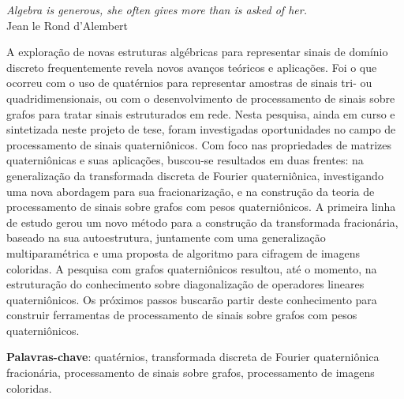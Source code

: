 \documentclass[
	11pt,				%
	openright,			%
	twoside,			%
	a4paper,			%
	french,				%
	brazil,			%
	english				%
	]{abntex2}
\begin{document}

\begin{epigrafe}
\vspace*{\fill}
\begin{flushright}
\textit{Algebra is generous, she often gives more than is asked of her.}\\
Jean le Rond d'Alembert
\end{flushright}
\end{epigrafe}


\setlength{\absparsep}{18pt} %
\begin{resumo}
A explora\c c\~ao de novas estruturas alg\'ebricas para representar sinais de dom\'inio discreto frequentemente revela novos avan\c cos te\'oricos e aplica\c c\~oes. Foi o que ocorreu com o uso de quat\'ernios para representar amostras de sinais tri- ou quadridimensionais, ou com o desenvolvimento de processamento de sinais sobre grafos para tratar sinais estruturados em rede. Nesta pesquisa, ainda em curso e sintetizada neste projeto de tese, foram investigadas oportunidades no campo de processamento de sinais quaterni\^onicos. Com foco nas propriedades de matrizes quaterni\^onicas e suas aplica\c c\~oes, buscou-se resultados em duas frentes: na generaliza\c c\~ao da transformada discreta de Fourier quaterni\^onica, investigando uma nova abordagem para sua fracionariza\c c\~ao, e na constru\c c\~ao da teoria de processamento de sinais sobre grafos com pesos quaterni\^onicos. A primeira linha de estudo gerou um novo m\'etodo para a constru\c c\~ao da transformada fracion\'aria, baseado na sua autoestrutura, juntamente com uma generaliza\c c\~ao multiparam\'etrica e uma proposta de algoritmo para cifragem de imagens coloridas. A pesquisa com grafos quaterni\^onicos resultou, at\'e o momento, na estrutura\c c\~ao do conhecimento sobre diagonaliza\c c\~ao de operadores lineares quaterni\^onicos. Os pr\'oximos passos buscar\~ao partir deste conhecimento para construir ferramentas de processamento de sinais sobre grafos com pesos quaterni\^onicos.

\textbf{Palavras-chave}: quat\'ernios, transformada discreta de Fourier quaterni\^onica fracion\'aria, processamento de sinais sobre grafos, processamento de imagens coloridas.
\end{resumo}
\end{document}
